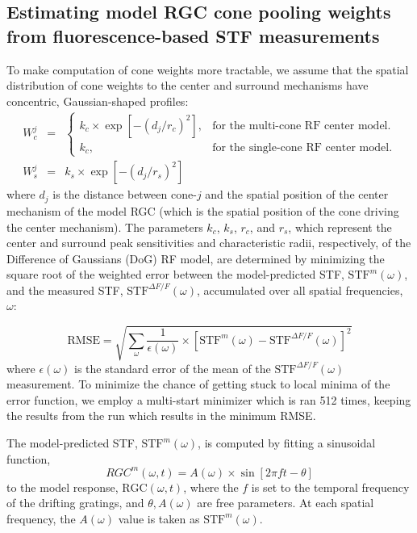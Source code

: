 \documentclass[11pt, oneside]{article}   	%
\begin{document}
\subsection{Estimating model RGC cone pooling weights from fluorescence-based STF measurements}
%
To make computation of cone weights more tractable, we assume that the spatial distribution of cone weights to the center and surround mechanisms have concentric, Gaussian-shaped profiles:
\begin{eqnarray}
W_c^j  & = & \begin{cases}
   k_c \times  \exp \left [ -\left( d_{j}/r_c \right) ^2 \right ], & \text{for the multi-cone RF center model}.\\
   k_c, & \text{for the single-cone RF center model}.
   \end{cases} \\
W_s^j &= &k_s \times \exp \left [ -\left( d_{j}/r_s \right) ^2 \right ]
\end{eqnarray}
\noindent where $d_j$ is the distance between cone-$j$ and the spatial position of the center mechanism of the model RGC (which is the spatial position of the cone driving the center mechanism). The parameters $k_c$, $k_s$, $r_c$, and $r_s$, which represent the center and surround peak sensitivities and characteristic radii, respectively, of the Difference of Gaussians (DoG) RF model, are determined by minimizing the square root of the weighted error between the model-predicted STF, $\mbox{STF}^{m}(\omega)$, and the measured STF, $\mbox{STF}^{\Delta F / F}(\omega)$, accumulated over all spatial frequencies, $\omega$:

\begin{equation}
\mbox{RMSE} = \displaystyle \sqrt{\sum_{\omega} \frac{1}{\epsilon({\omega})} \times {\left [  \mbox{STF}^{m}(\omega)  - \mbox{STF}^{\Delta F / F}(\omega) \right ] }^2}
\end{equation}
where $\epsilon({\omega})$ is the standard error of the mean of the $\mbox{STF}^{\Delta F / F}(\omega)$ measurement. To minimize the chance of getting stuck to local minima of the error function, we employ a multi-start minimizer which is ran 512 times, keeping the results from the run which results in the minimum RMSE.

The model-predicted STF, $\mbox{STF}^{m}(\omega)$, is computed by fitting a sinusoidal function, 
\begin{equation}
RGC^m(\omega,t) = A(\omega) \times \sin \left [ 2 \pi f t - \theta \right]
\end{equation}
to the model response, $\mbox{RGC}(\omega,t)$, where the $f$ is set to the temporal frequency of the drifting gratings, and $\theta, A(\omega)$ are free parameters. At each spatial frequency, the $A(\omega)$ value is taken as $\mbox{STF}^{m}(\omega)$. 
\end{document}
